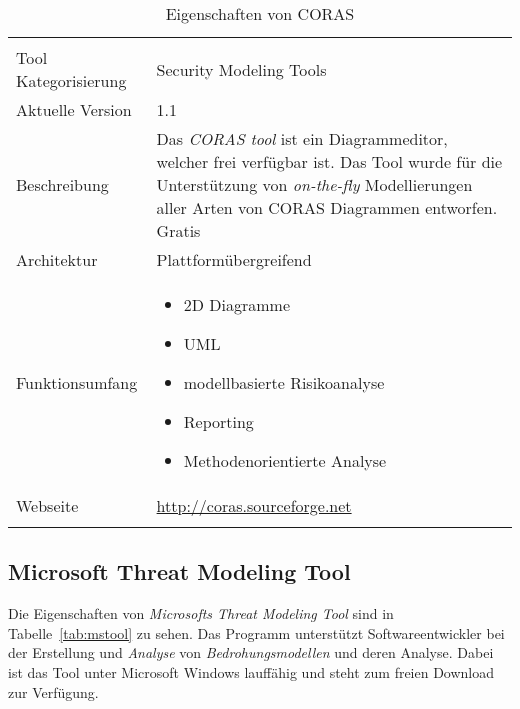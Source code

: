 \begin{table}[htbp]
\renewcommand{\arraystretch}{1.5}
\caption{Eigenschaften von CORAS}
\label{tab:coras}
\begin{tabularx}{\textwidth}{ l !{\color{white}\vrule}  X }
{}   					\\
\hline
{}Tool Kategorisierung 	& Security Modeling Tools	\\
\hline
{}Aktuelle Version  		& 1.1 								\\
\hline
{}Beschreibung				& Das \textit{CORAS tool} ist ein Diagrammeditor, welcher frei verfügbar ist.
Das Tool wurde für die Unterstützung von \textit{on-the-fly} Modellierungen aller Arten von CORAS Diagrammen entworfen.
 		\linebreak \linebreak Gratis							\\
\hline
{}Architektur				& Plattformübergreifend \\
\hline
{}Funktionsumfang		& \begin{itemize}
										\item  2D Diagramme
										\item UML
										\item modellbasierte Risikoanalyse
										\item Reporting
										\item Methodenorientierte Analyse
									\end{itemize}\\
\hline
{} Webseite		&		\url{http://coras.sourceforge.net} \\
\hline
\end{tabularx}
\end{table}

\pagebreak
\subsection{Microsoft Threat Modeling Tool}
Die Eigenschaften von \textit{Microsofts Threat Modeling Tool} sind in Tabelle~\ref{tab:mstool} zu sehen.
Das Programm unterstützt Softwareentwickler bei der Erstellung und \textit{Analyse} von \textit{Bedrohungsmodellen} und deren Analyse. Dabei ist das Tool unter Microsoft Windows lauffähig und steht zum freien Download zur Verfügung.

